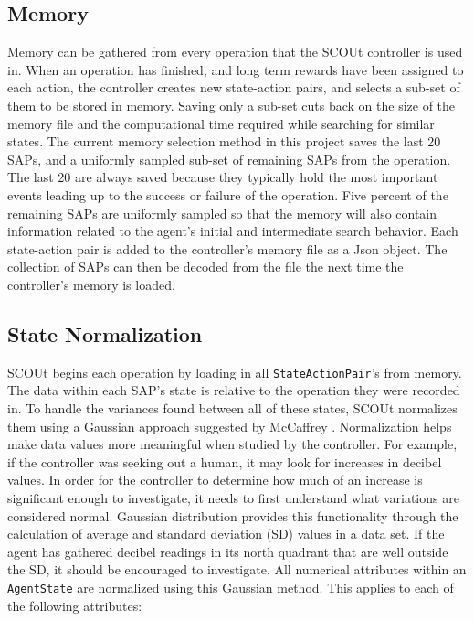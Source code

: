 \subsection{Memory}
Memory can be gathered from every operation that the SCOUt controller is used in.
When an operation has finished, and long term rewards have been assigned to each action, the controller creates new state-action pairs, and selects a sub-set of them to be stored in memory.
Saving only a sub-set cuts back on the size of the memory file and the computational time required while searching for similar states.
The current memory selection method in this project saves the last 20 SAPs, and a uniformly sampled sub-set of remaining SAPs from the operation.
The last 20 are always saved because they typically hold the most important events leading up to the success or failure of the operation.
Five percent of the remaining SAPs are uniformly sampled so that the memory will also contain information related to the agent's initial and intermediate search behavior.
Each state-action pair is added to the controller's memory file as a Json object.
The collection of SAPs can then be decoded from the file the next time the controller's memory is loaded.


\subsection{State Normalization}
SCOUt begins each operation by loading in all \texttt{StateActionPair}'s from memory.
The data within each SAP's state is relative to the operation they were recorded in.
To handle the variances found between all of these states, SCOUt normalizes them using a Gaussian approach suggested by McCaffrey \cite{mccaffrey_how_nodate}.
Normalization helps make data values more meaningful when studied by the controller.
For example, if the controller was seeking out a human, it may look for increases in decibel values.
In order for the controller to determine how much of an increase is significant enough to investigate, it needs to first understand what variations are considered normal.
Gaussian distribution provides this functionality through the calculation of average and standard deviation (SD) values in a data set.
If the agent has gathered decibel readings in its north quadrant that are well outside the SD, it should be encouraged to investigate.
All numerical attributes within an \texttt{AgentState} are normalized using this Gaussian method.
This applies to each of the following attributes:

